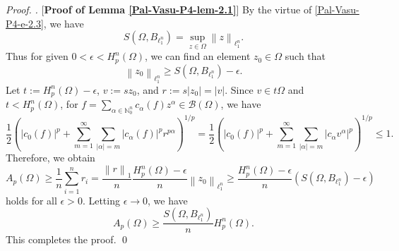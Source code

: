 \documentclass[a4paper,12pt]{amsart}
\theoremstyle{definition}
\newenvironment{pf}[1][]{%
 \vskip 3mm
 \noindent
 \ifthenelse{\equal{#1}{}}%
  {{\slshape Proof. }}%
  {{\slshape #1.} }%
 }%
{\qed\bigskip}
\newcommand{\norm}[1]{\left\lVert#1\right\rVert}
\begin{document}
\begin{pf} [{\bf Proof of Lemma \ref{Pal-Vasu-P4-lem-2.1}}]
	By the virtue of \eqref{Pal-Vasu-P4-e-2.3}, we have 
	\begin{equation*}
		S(\Omega, B_{\ell^n_{1}})=\sup_{z\in \Omega}\norm{z}_{\ell^n_{1}}.
	\end{equation*}
	Thus for given $0<\epsilon<H^n_{p}(\Omega)$, we can find an element $z_0\in \Omega$ such that 
	\begin{equation*}
		\norm{z_0}_{\ell^n_1}\geq S(\Omega, B_{\ell^n_{1}})-\epsilon.
	\end{equation*}
	Let $t:=H^n_{p}(\Omega)-\epsilon$, $v:=sz_0$, and $r:=s|z_0|=|v|.$ Since $v\in t\Omega$ and $t<H^n_p(\Omega)$, for $f=\sum_{\alpha\in \mathbb{N}^n_{0}}c_{\alpha}(f)z^{\alpha}\in \mathcal{B}(\Omega)$, we have
	\begin{equation*}
		\frac{1}{2}\left(|c_0(f)|^p + \sum_{m=1}^{\infty}\sum_{|\alpha|=m}|c_{\alpha}(f)|^pr^{p\alpha}\right)^{1/p}=\frac{1}{2}\left(|c_0(f)|^p + \sum_{m=1}^{\infty}\sum_{|\alpha|=m}|c_{\alpha}v^{\alpha}|^p\right)^{1/p}\leq 1.
	\end{equation*}
	Therefore, we obtain 
	\begin{equation*}
		A_p(\Omega) \geq \frac{1}{n}\sum_{i=1}^{n}r_i = \frac{\norm{r}_{1}}{n} \frac{H^n_p(\Omega)-\epsilon}{n}\norm{z_0}_{\ell^n_{1}}\geq \frac{H^n_p(\Omega)-\epsilon}{n}\left(S(\Omega, B_{\ell^n_{1}})-\epsilon\right)
	\end{equation*}
	holds for all $\epsilon>0.$ Letting $\epsilon \rightarrow 0$, we have 
	\begin{equation*}
		A_p(\Omega) \geq \frac{S(\Omega, B_{\ell^n_1})}{n}H^n_{p}(\Omega).
	\end{equation*}
	This completes the proof.
\end{pf}
\end{document}
